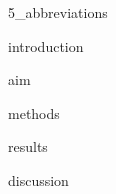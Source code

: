 \documentclass[12pt, leqno, oneside, a4paper]{book}
\begin{document}
{5_abbreviations}


\clearpage\pagebreak 
\pagestyle{headings}
\onehalfspacing 

\pagestyle{fancy} 
\renewcommand{\headrulewidth}{0.0pt}
\renewcommand{\footrulewidth}{0.0pt}
 \rhead[]{}
 \chead[]{}
 \lhead[]{}
 \lfoot[]{}
 \cfoot[]{\thepage} 
 \rfoot[]{}

 

{introduction}


{aim}


{methods}


{results}


{discussion}

\renewcommand{\headrulewidth}{0.0pt}
\renewcommand{\footrulewidth}{0.0pt}
 \rhead[]{}
 \chead[]{}
 \lhead[]{}
 \lfoot[]{}
 \cfoot[]{\thepage} 
 \rfoot[]{}

\clearpage \pagebreak\singlespace
 \normalsize
 
\clearpage \pagebreak


\onehalfspacing
\appendix
\AppendixMM


\end{document}
